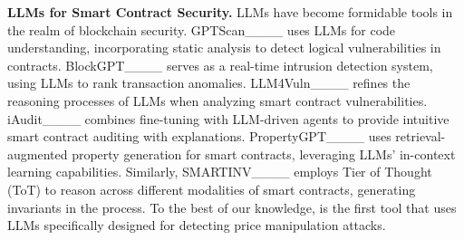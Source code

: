 \noindent
\textbf{LLMs for Smart Contract Security.}
LLMs have become formidable tools in the realm of blockchain security.
GPTScan____ uses LLMs for code understanding, incorporating static analysis to detect logical vulnerabilities in contracts.
BlockGPT____ serves as a real-time intrusion detection system, using LLMs to rank transaction anomalies.
LLM4Vuln____ refines the reasoning processes of LLMs when analyzing smart contract vulnerabilities.
iAudit____ combines fine-tuning with LLM-driven agents to provide intuitive smart contract auditing with explanations.
PropertyGPT____ uses retrieval-augmented property generation for smart contracts, leveraging LLMs' in-context learning capabilities.
Similarly, SMARTINV____ employs Tier of Thought (ToT) to reason across different modalities of smart contracts, generating invariants in the process.
To the best of our knowledge, \tool is the first tool that uses LLMs specifically designed for detecting price manipulation attacks.

